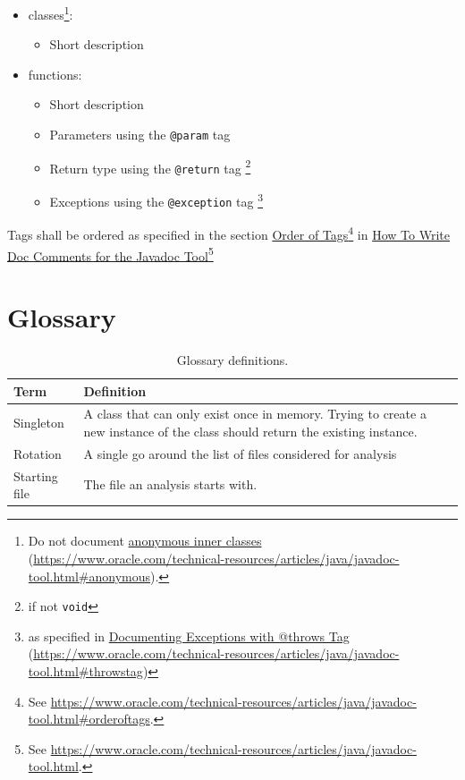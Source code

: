 \documentclass[11pt]{article} %
\begin{document}
    \begin{itemize}
        \item[] classes\footnote{Do not document \href{https://www.oracle.com/technical-resources/articles/java/javadoc-tool.html#anonymous}{anonymous inner classes} (\url{https://www.oracle.com/technical-resources/articles/java/javadoc-tool.html#anonymous}).}:
        \begin{itemize}
            \item Short description
        \end{itemize}
        \item[] functions:
        \begin{itemize}
            \item Short description
            \item Parameters using the \verb|@param| tag
            \item Return type using the \verb|@return| tag \footnote{if not \verb|void|}
            \item Exceptions using the \verb|@exception| tag \footnote{as specified in \href{https://www.oracle.com/technical-resources/articles/java/javadoc-tool.html#throwstag}{Documenting Exceptions with @throws Tag} (\url{https://www.oracle.com/technical-resources/articles/java/javadoc-tool.html#throwstag})}
        \end{itemize}
    \end{itemize}

    Tags shall be ordered as specified in the section \href{https://www.oracle.com/technical-resources/articles/java/javadoc-tool.html#orderoftags}{Order of Tags}\footnote{See \url{https://www.oracle.com/technical-resources/articles/java/javadoc-tool.html#orderoftags}.} in \href{https://www.oracle.com/technical-resources/articles/java/javadoc-tool.html}{How To Write Doc Comments for the Javadoc Tool}\footnote{See \url{https://www.oracle.com/technical-resources/articles/java/javadoc-tool.html}.}

    \newpage


    \section{Glossary}

    \begin{table}[H]
        \centering
        \begin{tabular}{p{.3\linewidth} | p{.6\linewidth}}
            \textbf{Term} & \textbf{Definition}
            \\\hline
            Singleton & A class that can only exist once in memory. Trying to create a new instance of the class
            should return the existing instance. \\\hline
            Rotation      & A single go around the list of files considered for analysis \\\hline
            Starting file & The file an analysis starts with.
        \end{tabular}
        \caption{Glossary definitions.}
        \label{tab:glossary}
    \end{table}
    \printbibliography[heading=bibintoc]
    \listoffigures
    \listoftables
\end{document}
